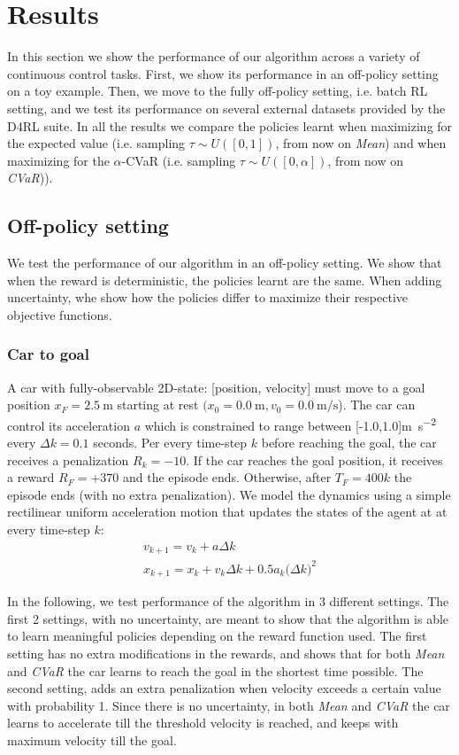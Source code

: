 \chapter{Results}
\label{sec:results}

In this section we show the performance of our algorithm across a variety of continuous
control tasks.
First, we show its performance in an off-policy setting on a toy example.
Then, we move to the fully off-policy setting, i.e. batch RL setting, and we test its performance
on several external datasets provided by the D4RL suite.
In all the results we compare the policies learnt when maximizing for the expected value
(i.e. sampling $\tau \sim U([0,1])$,
from now on \textit{Mean})
and when maximizing for the $\alpha$-CVaR (i.e. sampling $\tau \sim U([0,\alpha])$,
from now on \textit{CVaR})).

\section{Off-policy setting}
We test the performance of our algorithm in an off-policy setting.
We show that when the reward is deterministic, the policies learnt are the same.
When adding uncertainty, whe show how the policies differ to maximize their respective objective functions.
\subsection{Car to goal}

A car with fully-observable 2D-state: [position, velocity] must move to a goal
position $x_F=\SI{2.5}{\metre}$ starting at rest $(x_0=\SI{0.0}{\metre}, v_0=\SI{0.0}{\metre\per\s}$).
The car can control its acceleration $a$ which is constrained to range between 
[-1.0,1.0]\si{\metre\per\square\s} every $\Delta k=0.1$ seconds.
Per every time-step $k$ before reaching the goal, the car receives a penalization
$R_{k}=-10$.
If the car reaches the goal position, it receives a reward $R_F=+370$ and the episode ends.
Otherwise, after $T_F=400k$ the episode ends (with no extra penalization).
We model the dynamics using a simple rectilinear uniform acceleration motion that updates
the states of the agent at at every time-step $k$:
\begin{align}
        v_{k+1} = v_k + a\Delta{k}\\
        x_{k+1} = x_{k} + v_{k} \Delta{k} + 0.5a_{k} \big (\Delta k \big )^2      
\end{align}

In the following, we test performance of the algorithm in 3 different settings.
The first 2 settings, with no uncertainty, are meant to show that the algorithm is able to learn
meaningful policies depending on the reward function used.
The first setting has no extra modifications in the rewards, and shows that for both
\textit{Mean} and \textit{CVaR} the car learns to reach the goal 
in the shortest time possible.
The second setting, adds an extra penalization when velocity exceeds a certain value  with probability 1.
Since there is no uncertainty, in both
\textit{Mean} and \textit{CVaR} the car learns to accelerate till
the threshold velocity is reached, and keeps with maximum velocity till the goal.

